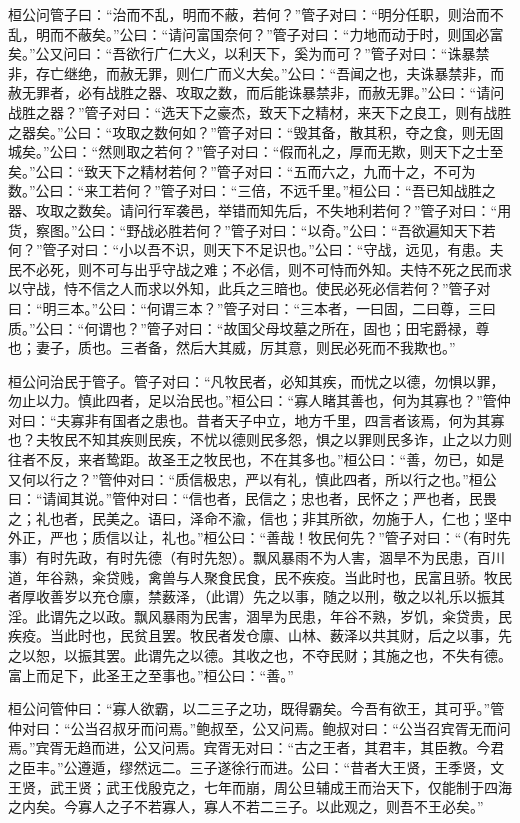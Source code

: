 \documentclass[]{article}
\begin{document}
桓公问管子曰：``治而不乱，明而不蔽，若何？''管子对曰：``明分任职，则治而不乱，明而不蔽矣。''公曰：``请问富国奈何？''管子对曰：``力地而动于时，则国必富矣。''公又问曰：``吾欲行广仁大义，以利天下，奚为而可？''管子对曰：``诛暴禁非，存亡继绝，而赦无罪，则仁广而义大矣。''公曰：``吾闻之也，夫诛暴禁非，而赦无罪者，必有战胜之器、攻取之数，而后能诛暴禁非，而赦无罪。''公曰：``请问战胜之器？''管子对曰：``选天下之豪杰，致天下之精材，来天下之良工，则有战胜之器矣。''公曰：``攻取之数何如？''管子对曰：``毁其备，散其积，夺之食，则无固城矣。''公曰：``然则取之若何？''管子对曰：``假而礼之，厚而无欺，则天下之士至矣。''公曰：``致天下之精材若何？''管子对曰：``五而六之，九而十之，不可为数。''公曰：``来工若何？''管子对曰：``三倍，不远千里。''桓公曰：``吾已知战胜之器、攻取之数矣。请问行军袭邑，举错而知先后，不失地利若何？''管子对曰：``用货，察图。''公曰：``野战必胜若何？''管子对曰：``以奇。''公曰：``吾欲遍知天下若何？''管子对曰：``小以吾不识，则天下不足识也。''公曰：``守战，远见，有患。夫民不必死，则不可与出乎守战之难；不必信，则不可恃而外知。夫恃不死之民而求以守战，恃不信之人而求以外知，此兵之三暗也。使民必死必信若何？''管子对曰：``明三本。''公曰：``何谓三本？''管子对曰：``三本者，一曰固，二曰尊，三曰质。''公曰：``何谓也？''管子对曰：``故国父母坟墓之所在，固也；田宅爵禄，尊也；妻子，质也。三者备，然后大其威，厉其意，则民必死而不我欺也。''

桓公问治民于管子。管子对曰：``凡牧民者，必知其疾，而忧之以德，勿惧以罪，勿止以力。慎此四者，足以治民也。''桓公曰：``寡人睹其善也，何为其寡也？''管仲对曰：``夫寡非有国者之患也。昔者天子中立，地方千里，四言者该焉，何为其寡也？夫牧民不知其疾则民疾，不忧以德则民多怨，惧之以罪则民多诈，止之以力则往者不反，来者鸷距。故圣王之牧民也，不在其多也。''桓公曰：``善，勿已，如是又何以行之？''管仲对曰：``质信极忠，严以有礼，慎此四者，所以行之也。''桓公曰：``请闻其说。''管仲对曰：``信也者，民信之；忠也者，民怀之；严也者，民畏之；礼也者，民美之。语曰，泽命不渝，信也；非其所欲，勿施于人，仁也；坚中外正，严也；质信以让，礼也。''桓公曰：``善哉！牧民何先？''管子对曰：``（有时先事）有时先政，有时先德（有时先恕）。飘风暴雨不为人害，涸旱不为民患，百川道，年谷熟，籴贷贱，禽兽与人聚食民食，民不疾疫。当此时也，民富且骄。牧民者厚收善岁以充仓廪，禁薮泽，（此谓）先之以事，随之以刑，敬之以礼乐以振其淫。此谓先之以政。飘风暴雨为民害，涸旱为民患，年谷不熟，岁饥，籴贷贵，民疾疫。当此时也，民贫且罢。牧民者发仓廪、山林、薮泽以共其财，后之以事，先之以恕，以振其罢。此谓先之以德。其收之也，不夺民财；其施之也，不失有德。富上而足下，此圣王之至事也。''桓公曰：``善。''

桓公问管仲曰：``寡人欲霸，以二三子之功，既得霸矣。今吾有欲王，其可乎。''管仲对曰：``公当召叔牙而问焉。''鲍叔至，公又问焉。鲍叔对曰：``公当召宾胥无而问焉。''宾胥无趋而进，公又问焉。宾胥无对曰：``古之王者，其君丰，其臣教。今君之臣丰。''公遵遁，缪然远二。三子遂徐行而进。公曰：``昔者大王贤，王季贤，文王贤，武王贤；武王伐殷克之，七年而崩，周公旦辅成王而治天下，仅能制于四海之内矣。今寡人之子不若寡人，寡人不若二三子。以此观之，则吾不王必矣。''
\end{document}
